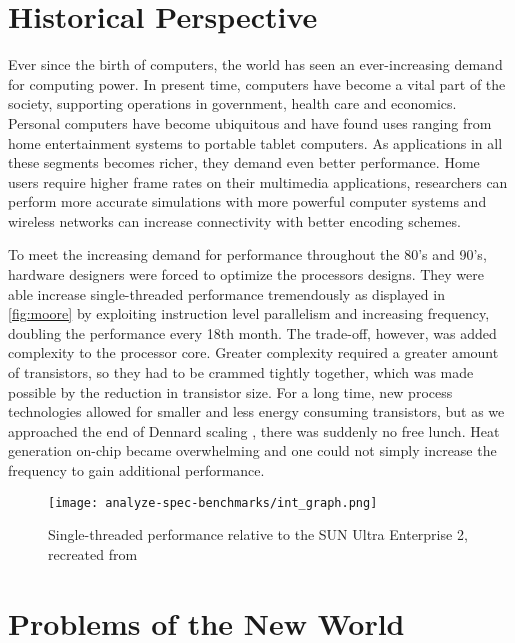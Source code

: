
\section{Historical Perspective}

Ever since the birth of computers, the world has seen an ever-increasing demand
for computing power. In present time, computers have become a vital part of the
society, supporting operations in government, health care and economics.
Personal computers have become ubiquitous and have found uses ranging from home
entertainment systems to portable tablet computers. As applications in all these
segments becomes richer, they demand even better performance. Home users require
higher frame rates on their multimedia applications, researchers can perform
more accurate simulations with more powerful computer systems and wireless
networks can increase connectivity with better encoding schemes.

To meet the increasing demand for performance throughout the 80's and 90's,
hardware designers were forced to optimize the processors designs. They were
able increase single-threaded performance tremendously as displayed in \autoref{fig:moore} by exploiting instruction
level parallelism and increasing frequency, doubling the performance every 18th
month. The trade-off, however, was added complexity to the processor core.
Greater complexity required a greater amount of transistors, so they had to be
crammed tightly together, which was made possible by the reduction in transistor
size. For a long time, new process technologies allowed for smaller and less
energy consuming transistors, but as we approached the end of Dennard scaling
\cite{dennard}, there was suddenly no free lunch. Heat generation on-chip
became overwhelming and one could not simply increase the frequency to gain
additional performance.

\begin{figure}
\texttt{[image: analyze-spec-benchmarks/int\_graph.png]}
\caption{Single-threaded performance relative to the SUN Ultra Enterprise 2, recreated from \cite{preshing}}
\label{fig:moore}
\end{figure}

\section{Problems of the New World}

